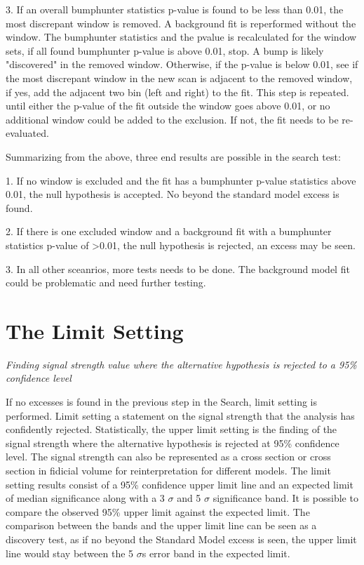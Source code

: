     3. If an overall bumphunter statistics p-value is found to be less than 0.01, the most discrepant window is removed. A background fit is reperformed without the window. The bumphunter statistics and the pvalue is recalculated for the window sets, if all found bumphunter p-value is above 0.01, stop. A bump is likely "discovered" in the removed window. Otherwise, if the p-value is below 0.01, see if the most discrepant window in the new scan is adjacent to the removed window, if yes, add the adjacent two bin (left and right) to the fit. This step is repeated. until either the p-value of the fit outside the window goes above 0.01, or no additional window could be added to the exclusion. If not, the fit needs to be re-evaluated.

    Summarizing from the above, three end results are possible in the search test:

    1. If no window is excluded and the fit has a bumphunter p-value statistics above 0.01, the null hypothesis is accepted. No beyond the standard model excess is found. 

    2. If there is one excluded window and a background fit with a bumphunter statistics p-value of >0.01, the null hypothesis is rejected, an excess may be seen. 

    3. In all other sceanrios, more tests needs to be done. The background model fit could be problematic and need further testing.  

\section{The Limit Setting}

\textit{Finding signal strength value where the alternative hypothesis is rejected to a 95\% confidence level}

If no excesses is found in the previous step in the Search, limit setting is performed. Limit setting a statement on the signal strength that the analysis has confidently rejected. Statistically, the upper limit setting is the finding of the signal strength where the alternative hypothesis is rejected at 95\% confidence level. The signal strength can also be represented as a cross section or cross section in fidicial volume for reinterpretation for different models. 
The limit setting results consist of a 95\% confidence upper limit line and an expected limit of median significance along with a 3 $\sigma$ and 5 $\sigma$ significance band. It is possible to compare the observed 95\% upper limit against the expected limit. The comparison between the bands and the upper limit line can be seen as a discovery test, as if no beyond the Standard Model excess is seen, the upper limit line would stay between the 5 $\sigma$s error band in the expected limit. 

